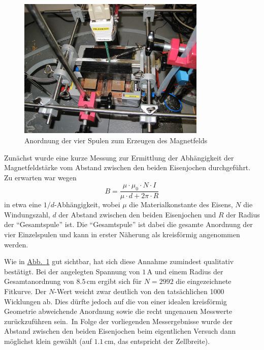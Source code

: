\documentclass[11pt]{scrartcl}
\newcommand{\unit}[1]{\ensuremath{\,\mathrm{#1}}} %
\newcommand{\abb}[1]{\hyperref[#1]{Abb.~\ref{#1}}}
\begin{document}
\begin{figure}[ht]
\begin{center}
\includegraphics[width=0.8\textwidth]{images/bfeld-vor2.jpg}
\end{center}
\vspace{-1.5\baselineskip}
\caption{Anordnung der vier Spulen zum Erzeugen des Magnetfelds}
\label{bfeld-vor2}
\end{figure}

Zunächst wurde eine kurze Messung zur Ermittlung der Abhängigkeit der Magnetfeldstärke vom Abstand zwischen den beiden Eisenjochen
durchgeführt. Zu erwarten war wegen 
\begin{equation}
B = \frac{\mu \cdot \mu_{0} \cdot N \cdot I}{\mu \cdot d + 2 \pi \cdot R}
\end{equation}
in etwa eine $1/d$-Abhängigkeit, wobei $\mu$ die Materialkonstante des Eisens, $N$ die Windungszahl, $d$ der Abstand zwischen den beiden Eisenjochen und $R$ der Radius der "`Gesamtspule"' ist. Die "`Gesamtspule"' ist dabei die gesamte Anordnung der vier Einzelspulen und kann in erster Näherung als kreisförmig angenommen werden.

Wie in \abb{bfeld-vor2} gut sichtbar, hat sich diese Annahme zumindest qualitativ bestätigt. Bei der angelegten Spannung von $1 \unit{A}$ und einem Radius der Gesamtanordnung von $8.5 \unit{cm}$ ergibt sich für $N=2992$ die eingezeichnete Fitkurve. Der $N$-Wert weicht zwar deutlich von den tatsächlichen 1000 Wicklungen ab. Dies dürfte jedoch auf die von einer idealen kreisförmig Geometrie abweichende Anordnung sowie die recht ungenauen Messwerte zurückzuführen sein.\ In Folge der vorliegenden Messergebnisse wurde der Abstand zwischen den beiden Eisenjochen beim eigentlichen Versuch dann möglichst klein gewählt (auf $1.1 \unit{cm}$, das entspricht der Zellbreite).
\end{document}
